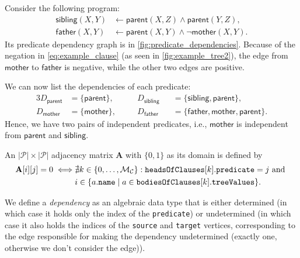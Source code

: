 \documentclass[runningheads]{llncs}
\newcommand{\variable}[1]{\texttt{\textup{#1}}}
\newcommand{\predicates}{\mathcal{P}}
\newcommand{\maxNumClauses}{\mathcal{M}_{\mathcal{C}}}
\begin{document}
\begin{example} \label{ex:program}
  Consider the following program:
  \begin{align}
    \mathsf{sibling}(X, Y) &\gets \mathsf{parent}(X, Z) \land \mathsf{parent}(Y, Z), \nonumber \\
    \mathsf{father}(X, Y) &\gets \mathsf{parent}(X, Y) \land \neg\mathsf{mother}(X, Y). \label{eq:example_clause}
  \end{align}
  Its predicate dependency graph is in \cref{fig:predicate_dependencies}.
  Because of the negation in \cref{eq:example_clause} (as seen in
  \cref{fig:example_tree2}), the edge from $\mathsf{mother}$ to
  $\mathsf{father}$ is negative, while the other two edges are positive.

  We can now list the dependencies of each predicate:
  \begin{alignat*}{3}
    D_{\mathsf{parent}} &= \{ \mathsf{parent} \}, \quad && D_{\mathsf{sibling}}
    &&= \{\mathsf{sibling}, \mathsf{parent} \},\\
    D_{\mathsf{mother}} &= \{ \mathsf{mother} \}, \quad && D_{\mathsf{father}}
    &&= \{ \mathsf{father}, \mathsf{mother}, \mathsf{parent} \}.
  \end{alignat*}
  Hence, we have two pairs of independent predicates, i.e., $\mathsf{mother}$ is
  independent from $\mathsf{parent}$ and $\mathsf{sibling}$.
\end{example}

\begin{definition} \label{def:adjacency_matrix}
  An $|\predicates{}| \times |\predicates{}|$ adjacency matrix $\mathbf{A}$ with
  $\{ 0, 1 \}$ as its domain is defined by
  \begin{align*}
    \mathbf{A}[i][j] = 0 \iff &\nexists k \in \{ 0, \dots, \maxNumClauses{} \}: \variable{headsOfClauses}[k].\variable{predicate} = j \text{ and } \\
    &i \in \{ a.\variable{name} \mid a \in \variable{bodiesOfClauses}[k].\variable{treeValues} \}.
  \end{align*}
\end{definition}

We define a \emph{dependency} as an algebraic data type that is either
determined (in which case it holds only the index of the \texttt{predicate}) or
undetermined (in which case it also holds the indices of the \texttt{source} and
\texttt{target} vertices, corresponding to the edge responsible for making the
dependency undetermined (exactly one, otherwise we don't consider the edge)).
\end{document}
